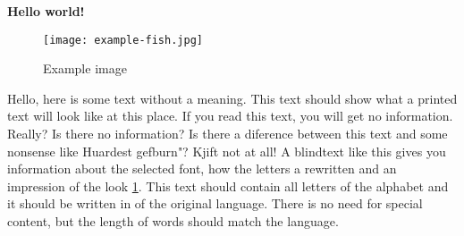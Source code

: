 \documentclass[../main.tex]{subfiles}
\begin{document}
\textbf{Hello world!}
 
\begin{figure}[H]
    \centering
    \texttt{[image: example-fish.jpg]}
    \caption{Example image}
    \label{fig:ex_img}
\end{figure}

Hello, here is some text without a meaning.  This text should show what a printed text will look like at this place.  If you read this text, you will get no information.  Really?  Is there no information?  Is there a diference between this text and some nonsense like Huardest gefburn"?  Kjift  not at all!  A blindtext like this gives you information about the selected font, how the letters a rewritten and an impression of the look \ref{fig:ex_img}.  This text should contain all letters of the alphabet and it should be written in of the original language.  There is no need for special content, but the length of words should match the language.
\end{document}
